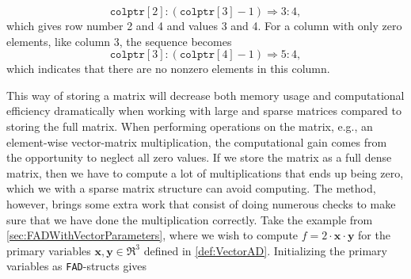 \begin{equation*}
    \texttt{colptr}[2]:(\texttt{colptr}[3]-1) \Longrightarrow 3:4,
\end{equation*}
which gives row number 2 and 4 and values 3 and 4. For a column with only zero elements, like column 3, the sequence becomes
\begin{equation*}
    \texttt{colptr}[3]:(\texttt{colptr}[4]-1)\Longrightarrow 5:4,
\end{equation*}
which indicates that there are no nonzero elements in this column. 

This way of storing a matrix will decrease both memory usage and computational efficiency dramatically when working with large and sparse matrices compared to storing the full matrix. When performing operations on the matrix, e.g., an element-wise vector-matrix  multiplication, the computational gain comes from the opportunity to neglect all zero values. If we store the matrix as a full dense matrix, then we have to compute a lot of multiplications that ends up being zero, which we with a sparse matrix structure can avoid computing. The method, however, brings some extra work that consist of doing numerous checks to make sure that we have done the multiplication correctly. Take the example from \autoref{sec:FADWithVectorParameters}, where we wish to compute $f = 2\cdot \textbf{x}\cdot \textbf{y}$ for the primary variables $\textbf{x},\textbf{y}\in \Re^3$ defined in \eqref{def:VectorAD}. Initializing the primary variables as \texttt{FAD}-structs gives 
